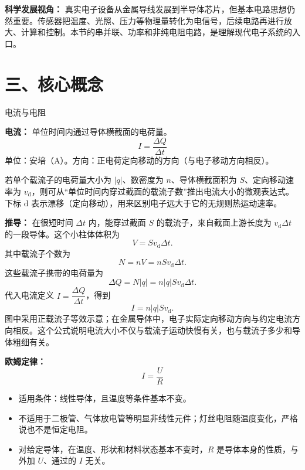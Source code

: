 \textbf{科学发展视角：} 真实电子设备从金属导线发展到半导体芯片，但基本电路思想仍然重要。传感器把温度、光照、压力等物理量转化为电信号，后续电路再进行放大、计算和控制。本节的串并联、功率和非纯电阻电路，是理解现代电子系统的入口。

\section*{三、核心概念}

\begin{conceptbox}{电流与电阻}

\textbf{电流：} 单位时间内通过导体横截面的电荷量。
\[
I = \frac{\Delta Q}{\Delta t}
\]
单位：安培（$\mathrm{A}$）。方向：正电荷定向移动的方向（与电子移动方向相反）。

\begin{center}


\label{fig:current-microscopic}
\end{center}

若单个载流子的电荷量大小为 $\lvert q\rvert$、数密度为 $n$、导体横截面积为 $S$、定向移动速率为 $v_{\mathrm d}$，则可从“单位时间内穿过截面的载流子数”推出电流大小的微观表达式。下标 $\mathrm d$ 表示漂移（定向移动），用来区别电子远大于它的无规则热运动速率。

\textbf{推导：} 在很短时间 $\Delta t$ 内，能穿过截面 $S$ 的载流子，来自截面上游长度为 $v_{\mathrm d}\Delta t$ 的一段导体。这个小柱体体积为
\[
V=S v_{\mathrm d}\Delta t.
\]
其中载流子个数为
\[
N=nV=nSv_{\mathrm d}\Delta t.
\]
这些载流子携带的电荷量为
\[
\Delta Q=N\lvert q\rvert=n\lvert q\rvert Sv_{\mathrm d}\Delta t.
\]
代入电流定义 $I=\dfrac{\Delta Q}{\Delta t}$，得到
\[
\boxed{I=n\lvert q\rvert Sv_{\mathrm d}}.
\]
图中采用正载流子等效示意；在金属导体中，电子实际定向移动方向与约定电流方向相反。这个公式说明电流大小不仅与载流子运动快慢有关，也与载流子多少和导体粗细有关。

\textbf{欧姆定律：}
\[
\boxed{I = \frac{U}{R}}
\]

\begin{itemize}
  \item 适用条件：线性导体，且温度等条件基本不变。
  \item 不适用于二极管、气体放电管等明显非线性元件；灯丝电阻随温度变化，严格说也不是恒定电阻。
  \item 对给定导体，在温度、形状和材料状态基本不变时，$R$ 是导体本身的性质，与外加 $U$、通过的 $I$ 无关。
\end{itemize}


\end{conceptbox}
